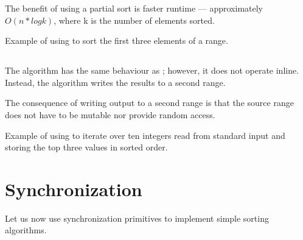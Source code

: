 

The benefit of using a partial sort is faster runtime — approximately $O(n*logk)$, where k is the number of elements sorted.

\begin{codebox}[]{\href{https://compiler-explorer.com/z/j6xjM4GnT}{\ExternalLink}}
\footnotesize Example of using  to sort the first three elements of a range.
\tcblower
{}
\end{codebox}

\subsection{\texorpdfstring{}{\texttt{std::partial\_sort\_copy}}}

The  algorithm has the same behaviour as \linebreak{}; however, it does not operate inline. Instead, the algorithm writes the results to a second range.


The consequence of writing output to a second range is that the source range does not have to be mutable nor provide random access.

\begin{codebox}[]{\href{https://compiler-explorer.com/z/vjKc5nY31}{\ExternalLink}}
\footnotesize Example of using  to iterate over ten integers read from standard input and storing the top three values in sorted order.
\tcblower
{}
\end{codebox}

\section{Synchronization}

Let us now use synchronization primitives to implement simple sorting algorithms. 

